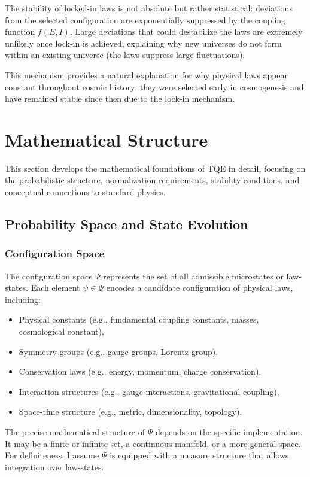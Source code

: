 \documentclass[12pt,a4paper]{article}
\theoremstyle{definition}
\theoremstyle{remark}
\begin{document}
The stability of locked-in laws is not absolute but rather statistical: deviations from the selected configuration are exponentially suppressed by the coupling function $f(E,I)$. Large deviations that could destabilize the laws are extremely unlikely once lock-in is achieved, explaining why new universes do not form within an existing universe (the laws suppress large fluctuations).

This mechanism provides a natural explanation for why physical laws appear constant throughout cosmic history: they were selected early in cosmogenesis and have remained stable since then due to the lock-in mechanism.

\section{Mathematical Structure}

This section develops the mathematical foundations of TQE in detail, focusing on the probabilistic structure, normalization requirements, stability conditions, and conceptual connections to standard physics.

\subsection{Probability Space and State Evolution}

\subsubsection{Configuration Space}

The configuration space $\Psi$ represents the set of all admissible microstates or law-states. Each element $\psi \in \Psi$ encodes a candidate configuration of physical laws, including:
\begin{itemize}
\item Physical constants (e.g., fundamental coupling constants, masses, cosmological constant),
\item Symmetry groups (e.g., gauge groups, Lorentz group),
\item Conservation laws (e.g., energy, momentum, charge conservation),
\item Interaction structures (e.g., gauge interactions, gravitational coupling),
\item Space-time structure (e.g., metric, dimensionality, topology).
\end{itemize}

The precise mathematical structure of $\Psi$ depends on the specific implementation. It may be a finite or infinite set, a continuous manifold, or a more general space. For definiteness, I assume $\Psi$ is equipped with a measure structure that allows integration over law-states.
\end{document}

